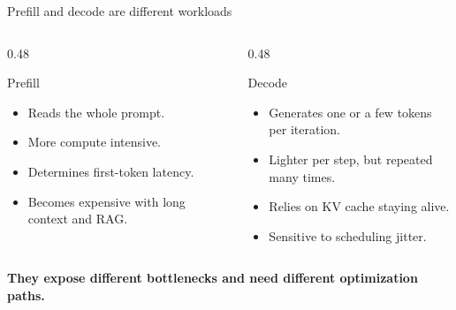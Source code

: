 \documentclass[aspectratio=169,11pt]{beamer}
\newcommand{\key}[1]{\textcolor{HUSTDeep}{\textbf{#1}}}
\begin{document}
\begin{frame}{Prefill and decode are different workloads}
  \begin{columns}[T,totalwidth=\textwidth]
    \begin{column}{0.48\textwidth}
      \begin{block}{Prefill}
        \begin{itemize}
          \item Reads the whole prompt.
          \item More compute intensive.
          \item Determines first-token latency.
          \item Becomes expensive with long context and RAG.
        \end{itemize}
      \end{block}
    \end{column}
    \begin{column}{0.48\textwidth}
      \begin{block}{Decode}
        \begin{itemize}
          \item Generates one or a few tokens per iteration.
          \item Lighter per step, but repeated many times.
          \item Relies on KV cache staying alive.
          \item Sensitive to scheduling jitter.
        \end{itemize}
      \end{block}
    \end{column}
  \end{columns}
  \vspace{0.3cm}
  \key{They expose different bottlenecks and need different optimization paths.}
\end{frame}
\end{document}
